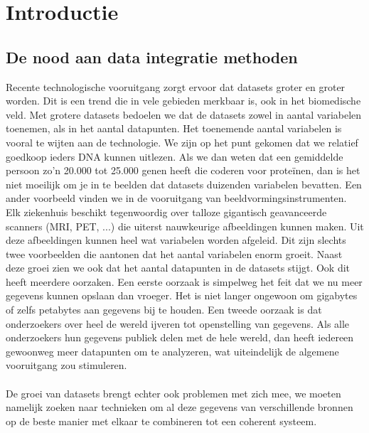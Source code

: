 \chapter{Introductie}
\label{cha:D:intro}
\section{De nood aan data integratie methoden}
Recente technologische vooruitgang zorgt ervoor dat datasets groter en groter worden. Dit is een trend die in vele gebieden merkbaar is, ook in het biomedische veld. Met grotere datasets bedoelen we dat de datasets zowel in aantal variabelen toenemen, als in het aantal datapunten. Het toenemende aantal variabelen is vooral te wijten aan de technologie. We zijn op het punt gekomen dat we relatief goedkoop ieders DNA kunnen uitlezen. Als we dan weten dat een gemiddelde persoon zo'n 20.000 tot 25.000 genen heeft die coderen voor prote\"inen, dan is het niet moeilijk om je in te beelden dat datasets duizenden variabelen bevatten. Een ander voorbeeld vinden we in de vooruitgang van beeldvormingsinstrumenten. Elk ziekenhuis beschikt tegenwoordig over talloze gigantisch geavanceerde scanners (MRI, PET, ...) die uiterst nauwkeurige afbeeldingen kunnen maken. Uit deze afbeeldingen kunnen heel wat variabelen worden afgeleid. Dit zijn slechts twee voorbeelden die aantonen dat het aantal variabelen enorm groeit. Naast deze groei zien we ook dat het aantal datapunten in de datasets stijgt. Ook dit heeft meerdere oorzaken. Een eerste oorzaak is simpelweg het feit dat we nu meer gegevens kunnen opslaan dan vroeger. Het is niet langer ongewoon om gigabytes of zelfs petabytes aan gegevens bij te houden. Een tweede oorzaak is dat onderzoekers over heel de wereld ijveren tot openstelling van gegevens. Als alle onderzoekers hun gegevens publiek delen met de hele wereld, dan heeft iedereen gewoonweg meer datapunten om te analyzeren, wat uiteindelijk de algemene vooruitgang zou stimuleren. \\ \\
De groei van datasets brengt echter ook problemen met zich mee, we moeten namelijk zoeken naar technieken om al deze gegevens van verschillende bronnen op de beste manier met elkaar te combineren tot een coherent systeem.

